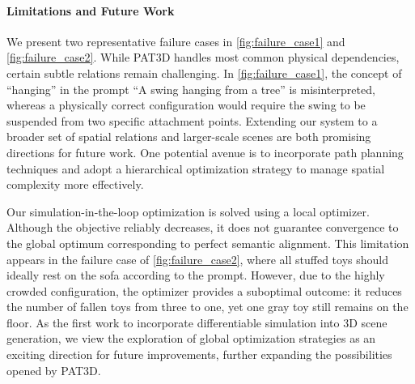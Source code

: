 \paragraph{Limitations and Future Work}
We present two representative failure cases in \autoref{fig:failure_case1} and \autoref{fig:failure_case2}. While PAT3D handles most common physical dependencies, certain subtle relations remain challenging. In \autoref{fig:failure_case1}, the concept of “hanging” in the prompt “A swing hanging from a tree” is misinterpreted, whereas a physically correct configuration would require the swing to be suspended from two specific attachment points. Extending our system to a broader set of spatial relations and larger-scale scenes are both promising directions for future work. One potential avenue is to incorporate path planning techniques and adopt a hierarchical optimization strategy to manage spatial complexity more effectively.

Our simulation-in-the-loop optimization is solved using a local optimizer. Although the objective reliably decreases, it does not guarantee convergence to the global optimum corresponding to perfect semantic alignment. This limitation appears in the failure case of \autoref{fig:failure_case2}, where all stuffed toys should ideally rest on the sofa according to the prompt. However, due to the highly crowded configuration, the optimizer provides a suboptimal outcome: it reduces the number of fallen toys from three to one, yet one gray toy still remains on the floor. As the first work to incorporate differentiable simulation into 3D scene generation, we view the exploration of global optimization strategies as an exciting direction for future improvements, further expanding the possibilities opened by PAT3D.


